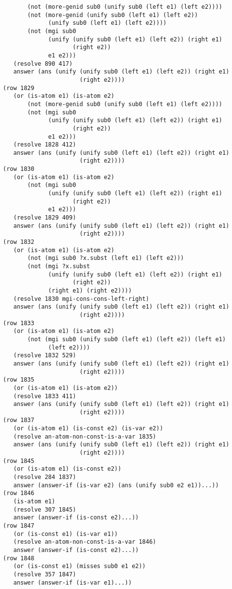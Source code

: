 \documentclass[runningheads]{llncs}
\begin{document}
\begin{verbatim}
       (not (more-genid sub0 (unify sub0 (left e1) (left e2))))
       (not (more-genid (unify sub0 (left e1) (left e2))
             (unify sub0 (left e1) (left e2))))
       (not (mgi sub0
             (unify (unify sub0 (left e1) (left e2)) (right e1)
                    (right e2))
             e1 e2)))
   (resolve 890 417)
   answer (ans (unify (unify sub0 (left e1) (left e2)) (right e1)
                      (right e2))))
(row 1829
   (or (is-atom e1) (is-atom e2)
       (not (more-genid sub0 (unify sub0 (left e1) (left e2))))
       (not (mgi sub0
             (unify (unify sub0 (left e1) (left e2)) (right e1)
                    (right e2))
             e1 e2)))
   (resolve 1828 412)
   answer (ans (unify (unify sub0 (left e1) (left e2)) (right e1)
                      (right e2))))
(row 1830
   (or (is-atom e1) (is-atom e2)
       (not (mgi sub0
             (unify (unify sub0 (left e1) (left e2)) (right e1)
                    (right e2))
             e1 e2)))
   (resolve 1829 409)
   answer (ans (unify (unify sub0 (left e1) (left e2)) (right e1)
                      (right e2))))
(row 1832
   (or (is-atom e1) (is-atom e2)
       (not (mgi sub0 ?x.subst (left e1) (left e2)))
       (not (mgi ?x.subst
             (unify (unify sub0 (left e1) (left e2)) (right e1)
                    (right e2))
             (right e1) (right e2))))
   (resolve 1830 mgi-cons-cons-left-right)
   answer (ans (unify (unify sub0 (left e1) (left e2)) (right e1)
                      (right e2))))
(row 1833
   (or (is-atom e1) (is-atom e2)
       (not (mgi sub0 (unify sub0 (left e1) (left e2)) (left e1)
             (left e2))))
   (resolve 1832 529)
   answer (ans (unify (unify sub0 (left e1) (left e2)) (right e1)
                      (right e2))))
(row 1835
   (or (is-atom e1) (is-atom e2))
   (resolve 1833 411)
   answer (ans (unify (unify sub0 (left e1) (left e2)) (right e1)
                      (right e2))))
(row 1837
   (or (is-atom e1) (is-const e2) (is-var e2))
   (resolve an-atom-non-const-is-a-var 1835)
   answer (ans (unify (unify sub0 (left e1) (left e2)) (right e1)
                      (right e2))))
(row 1845
   (or (is-atom e1) (is-const e2))
   (resolve 284 1837)
   answer (answer-if (is-var e2) (ans (unify sub0 e2 e1))...))
(row 1846
   (is-atom e1)
   (resolve 307 1845)
   answer (answer-if (is-const e2)...))
(row 1847
   (or (is-const e1) (is-var e1))
   (resolve an-atom-non-const-is-a-var 1846)
   answer (answer-if (is-const e2)...))
(row 1848
   (or (is-const e1) (misses sub0 e1 e2))
   (resolve 357 1847)
   answer (answer-if (is-var e1)...))

\end{verbatim}
\end{document}
